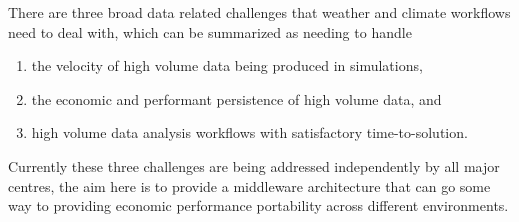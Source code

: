 

There are three broad data related challenges that weather and climate workflows need to deal with, which can be summarized as needing to handle
\begin{enumerate}
\item the velocity of high volume data being produced in simulations, 
\item the economic and performant persistence of high volume data, and
\item high volume data analysis workflows with satisfactory time-to-solution.
\end{enumerate}

Currently these three challenges are being addressed independently by all major centres,
the aim here is to provide a middleware architecture that can go some way to providing economic performance portability across different environments.

